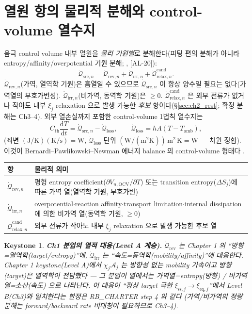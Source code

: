 \documentclass[11pt,a4paper]{article}
\newtheorem*{keybox}{Keystone}
\newcommand{\dd}{\mathrm{d}}
\newcommand{\eq}{\mathrm{eq}}
\newcommand{\OCV}{\mathrm{OCV}}
\newcommand{\irr}{\mathrm{irr}}
\newcommand{\rev}{\mathrm{rev}}
\newcommand{\src}{\mathrm{src}}
\newcommand{\loss}{\mathrm{loss}}
\newcommand{\amb}{\mathrm{amb}}
\newcommand{\rlx}{\mathrm{relax}}
\newcommand{\cand}{\mathrm{cand}}
\newcommand{\AL}[1]{\textsf{[AL-#1]}}
\begin{document}
\section{열원 항의 물리적 분해와 control-volume 열수지}\label{sec:ch2_decomp}
음극 control volume 내부 열원을 \emph{물리 기원별}로 분해한다(피팅 편의 분해가 아니라 entropy/affinity/overpotential
기원 분해; \cite{bernardi1985,rao1997}, \AL{20}):
\begin{equation}
\dot{\mathcal Q}_{\src,n}=\dot{\mathcal Q}_{\rev,n}+\dot{\mathcal Q}_{\irr,n}+\dot{\mathcal Q}_{\rlx,n}^{\cand}.
\label{eq:ch2_srcdecomp}
\end{equation}
$\dot{\mathcal Q}_{\rev,n}$(가역, 열역학 기원)은 흡열일 수 있으므로 $\dot{\mathcal Q}_{\src,n}$ 이 항상 양수일
필요는 없다(가역열의 부호가변성). $\dot{\mathcal Q}_{\irr,n}$(비가역, 동역학 기원)은 $\ge0$. $\dot{\mathcal Q}_{\rlx,n}^{\cand}$
은 외부 전류가 없거나 작아도 내부 $\xi_j$ relaxation 으로 발생 가능한 \emph{후보} 항이다(\S\ref{sec:ch2_rest};
확정 분해는 Ch3--4). 외부 열손실까지 포함한 control-volume 1법칙 열수지는
\begin{equation}
C_{\mathrm{th}}\frac{\dd T}{\dd t}=\dot{\mathcal Q}_{\src,n}-\dot{\mathcal Q}_{\loss},\qquad
\dot{\mathcal Q}_{\loss}=hA(T-T_\amb),
\label{eq:ch2_balance}
\end{equation}
(좌변 $\mathrm{(J/K)(K/s)=W}$, $\dot{\mathcal Q}_{\loss}$ 단위 $\mathrm{(W/(m^2K))\,m^2\,K=W}$ — 차원 정합).
이것이 Bernardi--Pawlikowski--Newman 에너지 balance 의 control-volume 형태다 \cite{bernardi1985,rao1997}.
\begin{longtable}{p{} p{}}
\toprule 항 & 물리적 의미 \\ \midrule \endhead
$\dot{\mathcal Q}_{\rev,n}$ & 평형 entropy coefficient($\partial V_{n,\OCV}/\partial T$) 또는 transition entropy($\Delta S_j$)에 따른 가역 열(열역학 기원, 부호가변) \\
$\dot{\mathcal Q}_{\irr,n}$ & overpotential$\cdot$reaction affinity$\cdot$transport limitation$\cdot$internal dissipation 에 의한 비가역 열(동역학 기원, $\ge0$) \\
$\dot{\mathcal Q}_{\rlx,n}^{\cand}$ & 외부 전류가 작아도 내부 $\xi_j$ relaxation 으로 발생 가능한 후보 열 \\
\bottomrule
\end{longtable}
\begin{keybox}
\textbf{Ch1 분업의 열적 대응(Level A 계승).} $\dot{\mathcal Q}_{\rev}$ 는 Chapter 1 의 ``방향=열역학(target/entropy)''에,
$\dot{\mathcal Q}_{\irr}$ 는 ``속도=동역학(mobility/affinity)''에 대응한다. Chapter 1 keystone(Level A)에서
$\chi_j\mathcal A_j$ 는 방향성 없는 mobility 가속이고 방향(target)은 열역학이 전담했다 — 그 분업이 열에서는
\emph{가역열=entropy(방향) / 비가역열=소산(속도)} 으로 나타난다. 이 대응이 ``정상 target 극한
$\xi_{\mathrm{ss},j}\to\xi_{\eq,j}$''에서 Level B(Ch3)와 일치한다는 한정은 RB\_CHARTER step 4 와 같다
(가역/비가역의 \emph{정량} 분해는 forward/backward rate 비대칭이 필요하므로 Ch3--4).
\end{keybox}
\end{document}
